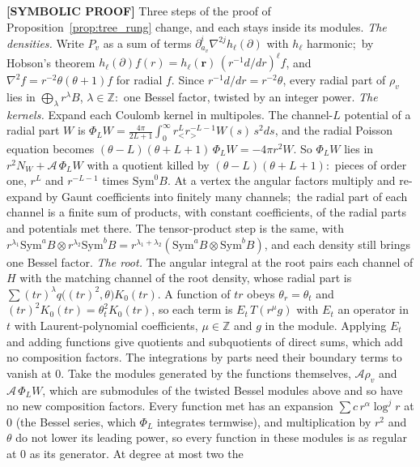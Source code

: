 \documentclass[aps,pra,twocolumn,superscriptaddress,longbibliography]{revtex4-2}
\begin{document}
\textbf{[SYMBOLIC PROOF]} Three steps of the proof of
Proposition~\ref{prop:tree_rung} change, and each stays inside its modules.
\emph{The densities.}  Write $P_v$ as a sum of terms
$\partial_{a_v}^i\nabla^{2j}h_\ell(\partial)$ with $h_\ell$ harmonic;\ by Hobson's theorem
$h_\ell(\partial)f(r)=h_\ell(\bm r)\,(r^{-1}d/dr)^\ell f$, and
$\nabla^2f=r^{-2}\theta(\theta+1)f$ for radial $f$.  Since
$r^{-1}d/dr=r^{-2}\theta$, every radial part of $\rho_v$ lies in
$\bigoplus_\lambda r^{\lambda}B$, $\lambda\in\mathbb{Z}$:\ one Bessel factor,
twisted by an integer power.  \emph{The kernels.}  Expand each Coulomb kernel
in multipoles.  The channel-$L$ potential of a radial part $W$ is
$\Phi_LW=\tfrac{4\pi}{2L+1}\int_0^\infty r_<^L r_>^{-L-1}W(s)\,s^2ds$, and the
radial Poisson equation becomes $(\theta-L)(\theta+L+1)\,\Phi_LW=-4\pi r^2W$.
So $\Phi_LW$ lies in $r^2N_W+\mathcal{A}\,\Phi_LW$ with a quotient killed by
$(\theta-L)(\theta+L+1)$:\ pieces of order one, $r^{L}$ and $r^{-L-1}$
times $\mathrm{Sym}^0B$.  At a vertex the angular factors multiply and
re-expand by Gaunt coefficients into finitely many channels;\ the radial part
of each channel is a finite sum of products, with constant coefficients, of
the radial parts and potentials met there.  The tensor-product step is the
same, with $r^{\lambda_1}\mathrm{Sym}^aB\otimes r^{\lambda_2}\mathrm{Sym}^bB=
r^{\lambda_1+\lambda_2}(\mathrm{Sym}^aB\otimes\mathrm{Sym}^bB)$, and each
density still brings one Bessel factor.  \emph{The root.}  The angular
integral at the root pairs each channel of $H$ with the matching channel of
the root density, whose radial part is
$\sum(tr)^{\lambda}q\bigl((tr)^2,\theta\bigr)K_0(tr)$.  A function of $tr$
obeys $\theta_r=\theta_t$ and $(tr)^2K_0(tr)=\theta_t^2K_0(tr)$, so each term
is $E_t\,T(r^{\mu}g)$ with $E_t$ an operator in $t$ with Laurent-polynomial
coefficients, $\mu\in\mathbb{Z}$ and $g$ in the module.  Applying $E_t$ and
adding functions give quotients and subquotients of direct sums, which add no
composition factors.  The integrations by parts need their boundary terms to
vanish at $0$.  Take the modules generated by the functions themselves,
$\mathcal{A}\rho_v$ and $\mathcal{A}\,\Phi_LW$, which are submodules of the
twisted Bessel modules above and so have no new composition factors.
Every function met has an expansion $\sum c\,r^\alpha\log^jr$ at $0$ (the
Bessel series, which $\Phi_L$ integrates termwise), and multiplication by
$r^2$ and $\theta$ do not lower its leading power, so every function in these
modules is as regular at $0$ as its generator.  At degree at most two the
\end{document}
